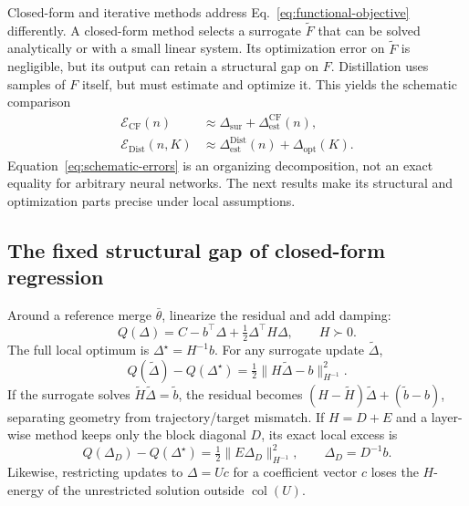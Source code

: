 \documentclass[letterpaper]{article} %
\theoremstyle{plain}
\theoremstyle{definition}
\begin{document}
Closed-form and iterative methods address Eq.~\eqref{eq:functional-objective} differently.
A closed-form method selects a surrogate $\widetilde F$ that can be solved analytically or with a small linear system.
Its optimization error on $\widetilde F$ is negligible, but its output can retain a structural gap on $F$.
Distillation uses samples of $F$ itself, but must estimate and optimize it.
This yields the schematic comparison
\begin{equation}
\begin{aligned}
\mathcal E_{\mathrm{CF}}(n)
&\approx \Delta_{\mathrm{sur}}+\Delta_{\mathrm{est}}^{\mathrm{CF}}(n),\\
\mathcal E_{\mathrm{Dist}}(n,K)
&\approx \Delta_{\mathrm{est}}^{\mathrm{Dist}}(n)
+\Delta_{\mathrm{opt}}(K).
\end{aligned}
\label{eq:schematic-errors}
\end{equation}
Equation~\eqref{eq:schematic-errors} is an organizing decomposition, not an exact equality for arbitrary neural networks.
The next results make its structural and optimization parts precise under local assumptions.

\subsection{The fixed structural gap of closed-form regression}
\label{sec:closed-form-gap}

Around a reference merge $\bar\theta$, linearize the residual and add damping:
\begin{equation}
Q(\Delta)=C-b^\top\Delta+\tfrac12\Delta^\top H\Delta,
\qquad H\succ0.
\label{eq:local-quadratic}
\end{equation}
The full local optimum is $\Delta^\star=H^{-1}b$.
For any surrogate update $\widetilde\Delta$,
\begin{equation}
Q(\widetilde\Delta)-Q(\Delta^\star)
=\tfrac12\|H\widetilde\Delta-b\|_{H^{-1}}^2.
\label{eq:gap-main}
\end{equation}
If the surrogate solves $\widetilde H\widetilde\Delta=\widetilde b$, the residual becomes $(H-\widetilde H)\widetilde\Delta+(\widetilde b-b)$, separating geometry from trajectory/target mismatch.
If $H=D+E$ and a layer-wise method keeps only the block diagonal $D$, its exact local excess is
\begin{equation}
Q(\Delta_D)-Q(\Delta^\star)
=\tfrac12\|E\Delta_D\|_{H^{-1}}^2,
\qquad \Delta_D=D^{-1}b.
\label{eq:cross-layer-gap-main}
\end{equation}
Likewise, restricting updates to $\Delta=Uc$ for a coefficient vector $c$ loses the $H$-energy of the unrestricted solution outside $\operatorname{col}(U)$.
\end{document}
